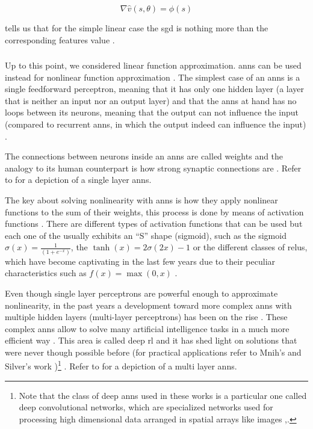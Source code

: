 \documentclass{seal_thesis}
\begin{document}
\begin{equation}
\label{eq:sgd_linear}
	\nabla \hat{v} (s,\theta) = \phi (s)
\end{equation}

 tells us that for the simple linear case the \gls{sgd} is nothing more than the corresponding features value  \cite[p. 199]{Sutton2017}.

\subsubsection{}
\label{subsubsec:ann_theory}

Up to this point, we considered linear function approximation. \glspl{ann} can be used instead for nonlinear function approximation \cite[p. 199]{Sutton2017}. The simplest case of an \glspl{ann} is a single feedforward perceptron, meaning that it has only one hidden layer (\ie a layer that is neither an input nor an output layer) and that the \glspl{ann} at hand has no loops between its neurons, meaning that the output can not influence the input (compared to recurrent \glspl{ann}, in which the output indeed can influence the input) \cite[p. 216]{Sutton2017}. 

The connections between neurons inside an \glspl{ann} are called weights and the analogy to its human counterpart is how strong synaptic connections are \cite[p. 216]{Sutton2017}. Refer to  for a depiction of a single layer \glspl{ann}.

The key about solving nonlinearity with \glspl{ann} is how they apply nonlinear functions to the sum of their weights, this process is done by means of activation functions \cite[p. 216]{Sutton2017}. There are different types of activation functions that can be used but each one of the usually exhibits an ``S'' shape (\ie sigmoid), such as the sigmoid $\sigma(x) = \frac{1}{(1+e^{-x})}$, the $\tanh(x) = 2\sigma(2x)-1$ or the different classes of \glspl{relu}, which have become captivating in the last few years due to their peculiar characteristics such as $f(x) = \max(0,x)$ \cite[p. 216]{Sutton2017}.


Even though single layer perceptrons are powerful enough to approximate nonlinearity, in the past years a development toward more complex \glspl{ann} with multiple hidden layers (\ie multi-layer perceptrons) has been on the rise \cite[p. 217]{Sutton2017}. These complex \glspl{ann} allow to solve many artificial intelligence tasks in a much more efficient way \cite{Bengio2009}. This area is called deep \gls{rl} and it has shed light on solutions that were never though possible before (for practical applications refer to Mnih's \cite{Mnih2015} and Silver's work \cite{Silver2016})\footnote{Note that the class of deep \glspl{ann} used in these works is a particular one called deep convolutional networks, which are specialized networks used for processing high dimensional data arranged in spatial arrays like images \cite[p. 219]{Sutton2017},\cite{Lecun1998}.} \cite{Bengio2009}. Refer to  for a depiction of a multi layer \glspl{ann}.
\end{document}
